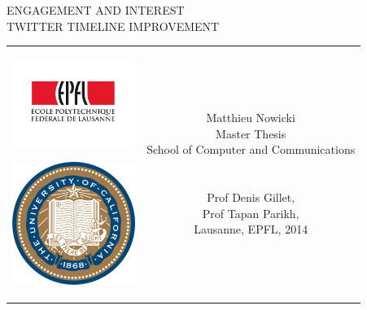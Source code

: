 \begin{titlepage}
\begin{center}
\sffamily


\null\vspace{2cm}
{\huge ENGAGEMENT AND INTEREST \\[12pt] TWITTER TIMELINE IMPROVEMENT} \\[24pt] 
    
\vfill

\begin{tabular} {cc}
\parbox{0.3\textwidth}{\includegraphics[width=4cm]{images/epfl}
\vspace{0.5cm}

\includegraphics[width=4cm]{images/berkeley}}
&
\parbox{0.7\textwidth}{%
	Matthieu Nowicki \\
	Master Thesis\\
	School of Computer and Communications\\
	\\
	\\
		
\small
    Prof Denis Gillet, \\
    Prof Tapan Parikh, \\

%
Lausanne, EPFL, 2014}
\end{tabular}
\end{center}
\vspace{2cm}
\end{titlepage}



